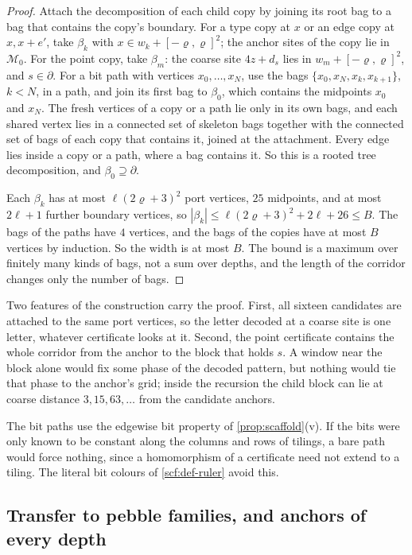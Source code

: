 \begin{proof}
Attach the decomposition of each child copy by joining its root bag to a bag that contains the copy's boundary. For a type copy at $x$ or an edge copy at $x,x+e'$, take $\beta_k$ with $x\in w_k+[-\varrho,\varrho]^2$; the anchor sites of the copy lie in $\mathcal M_0$. For the point copy, take $\beta_m$: the coarse site $4z+d_s$ lies in $w_m+[-\varrho,\varrho]^2$, and $s\in\partial$. For a bit path with vertices $x_0,\dots,x_N$, use the bags $\{x_0,x_N,x_k,x_{k+1}\}$, $k<N$, in a path, and join its first bag to $\beta_0$, which contains the midpoints $x_0$ and $x_N$. The fresh vertices of a copy or a path lie only in its own bags, and each shared vertex lies in a connected set of skeleton bags together with the connected set of bags of each copy that contains it, joined at the attachment. Every edge lies inside a copy or a path, where a bag contains it. So this is a rooted tree decomposition, and $\beta_0\supseteq\partial$.

Each $\beta_k$ has at most $\ell(2\varrho+3)^2$ port vertices, $25$ midpoints, and at most $2\ell+1$ further boundary vertices, so $|\beta_k|\le\ell(2\varrho+3)^2+2\ell+26\le B$. The bags of the paths have $4$ vertices, and the bags of the copies have at most $B$ vertices by induction. So the width is at most $B$. The bound is a maximum over finitely many kinds of bags, not a sum over depths, and the length of the corridor changes only the number of bags.
\end{proof}

Two features of the construction carry the proof. First, all sixteen candidates are attached to the same port vertices, so the letter decoded at a coarse site is one letter, whatever certificate looks at it. Second, the point certificate contains the whole corridor from the anchor to the block that holds $s$. A window near the block alone would fix some phase of the decoded pattern, but nothing would tie that phase to the anchor's grid; inside the recursion the child block can lie at coarse distance $3,15,63,\dots$ from the candidate anchors.

The bit paths use the edgewise bit property of \cref{prop:scaffold}(v). If the bits were only known to be constant along the columns and rows of tilings, a bare path would force nothing, since a homomorphism of a certificate need not extend to a tiling. The literal bit colours of \cref{scf:def-ruler} avoid this.

\subsection{Transfer to pebble families, and anchors of every depth}\label{scf:sub-transfer}

